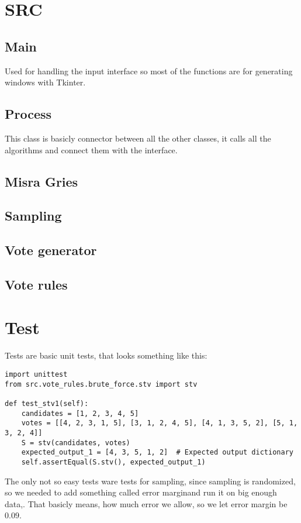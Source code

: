 \documentclass[a4paper,12pt]{report}
\begin{document}
	\chapter{SRC}
	
	\section{Main}
	
	Used for handling the input interface so most of the functions are for generating windows with Tkinter.
	
	\section{Process}
	
	This class is basicly connector between all the other classes, it calls all the algorithms and connect them with the interface.
	
	\section{Misra Gries}
	
	\section{Sampling}
	
	\section{Vote generator}
	
	\section{Vote rules}
	
	\chapter{Test}
	
	Tests are basic unit tests, that looks something like this:
	
	\begin{lstlisting}
import unittest
from src.vote_rules.brute_force.stv import stv

def test_stv1(self):
	candidates = [1, 2, 3, 4, 5]
	votes = [[4, 2, 3, 1, 5], [3, 1, 2, 4, 5], [4, 1, 3, 5, 2], [5, 1, 3, 2, 4]]
	S = stv(candidates, votes)
	expected_output_1 = [4, 3, 5, 1, 2]  # Expected output dictionary
	self.assertEqual(S.stv(), expected_output_1)
	\end{lstlisting}
	
	The only not so easy tests ware tests for sampling, since sampling is randomized, so we needed to add something called error marginand run it on big enough data,. That basicly means, how much error we allow, so we let error margin be $0.09$.
	
	
\end{document}
